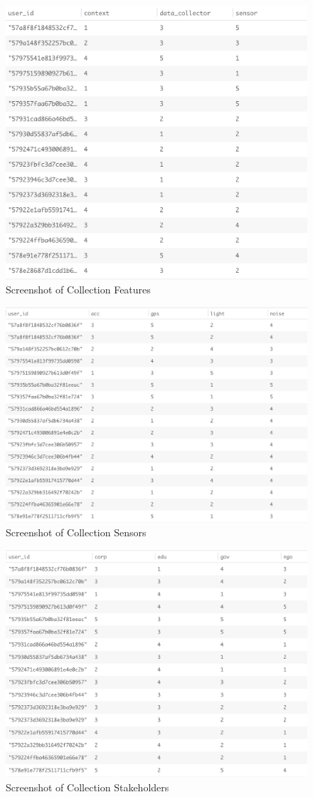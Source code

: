 \begin{figure}[ht!]
\centering
\includegraphics[width=\textwidth,keepaspectratio,height=0.6\textwidth]{./images/collection_feature_cat}
\caption{Screenshot of Collection Features}
\label{fig:col_f}
\end{figure}

\begin{figure}[ht!]
\centering
\includegraphics[width=\textwidth,keepaspectratio,height=0.6\textwidth]{./images/collection_sensors_cat}
\caption{Screenshot of Collection Sensors}
\label{fig:col_s}
\end{figure}

\begin{figure}[ht!]
\centering
\includegraphics[width=\textwidth,keepaspectratio,height=0.6\textwidth]{./images/collection_dc_cat}
\caption{Screenshot of Collection Stakeholders}
\label{fig:col_ss}
\end{figure}


